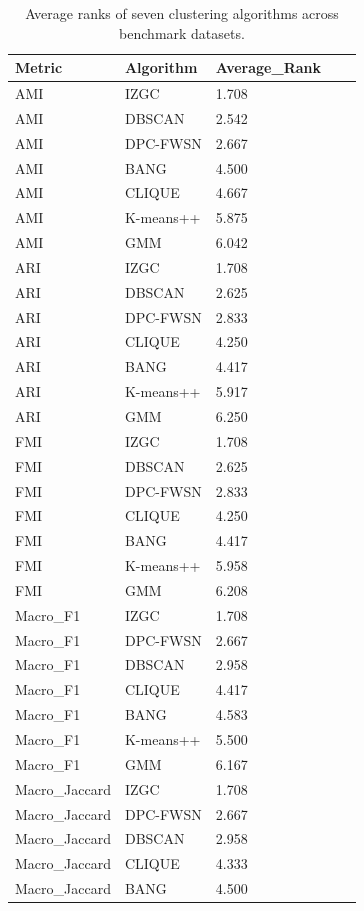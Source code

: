 
\begin{table}[ht]
\centering
\caption{
Average ranks of seven clustering algorithms across benchmark datasets.
}
\label{
tab:S3_rank
}

\scriptsize

\begin{tabular}{lllll}

\toprule
Metric & Algorithm & Average_Rank\\

\midrule
AMI & IZGC & 1.708\\
AMI & DBSCAN & 2.542\\
AMI & DPC-FWSN & 2.667\\
AMI & BANG & 4.500\\
AMI & CLIQUE & 4.667\\
AMI & K-means++ & 5.875\\
AMI & GMM & 6.042\\
ARI & IZGC & 1.708\\
ARI & DBSCAN & 2.625\\
ARI & DPC-FWSN & 2.833\\
ARI & CLIQUE & 4.250\\
ARI & BANG & 4.417\\
ARI & K-means++ & 5.917\\
ARI & GMM & 6.250\\
FMI & IZGC & 1.708\\
FMI & DBSCAN & 2.625\\
FMI & DPC-FWSN & 2.833\\
FMI & CLIQUE & 4.250\\
FMI & BANG & 4.417\\
FMI & K-means++ & 5.958\\
FMI & GMM & 6.208\\
Macro_F1 & IZGC & 1.708\\
Macro_F1 & DPC-FWSN & 2.667\\
Macro_F1 & DBSCAN & 2.958\\
Macro_F1 & CLIQUE & 4.417\\
Macro_F1 & BANG & 4.583\\
Macro_F1 & K-means++ & 5.500\\
Macro_F1 & GMM & 6.167\\
Macro_Jaccard & IZGC & 1.708\\
Macro_Jaccard & DPC-FWSN & 2.667\\
Macro_Jaccard & DBSCAN & 2.958\\
Macro_Jaccard & CLIQUE & 4.333\\
Macro_Jaccard & BANG & 4.500\\

\end{tabular}
\end{table}

